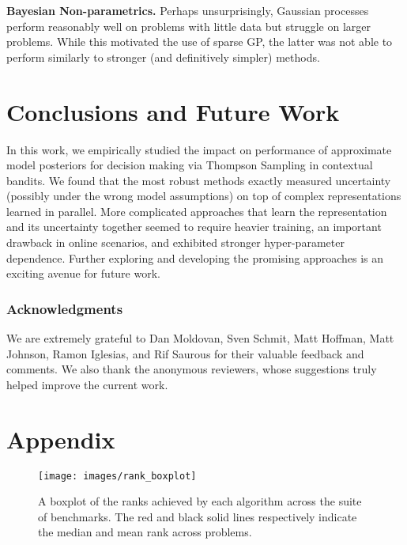 \documentclass{article} \usepackage{iclr2018_conference,times}
\begin{document}
\textbf{Bayesian Non-parametrics.} Perhaps unsurprisingly, Gaussian processes perform reasonably well on problems with little data but struggle on larger problems. While this motivated the use of sparse GP, the latter was not able to perform similarly to stronger (and definitively simpler) methods.
 \section{Conclusions and Future Work}\label{s:conclusions}

In this work, we empirically studied the impact on performance of approximate model posteriors for decision making via Thompson Sampling in contextual bandits.
We found that the most robust methods exactly measured uncertainty (possibly under the wrong model assumptions) on top of complex representations learned in parallel.
More complicated approaches that learn the representation and its uncertainty together seemed to require heavier training, an important drawback in online scenarios, and exhibited stronger hyper-parameter dependence.
Further exploring and developing the promising approaches is an exciting avenue for future work.
 



\newcommand*\rot{\rotatebox{90}}








\subsubsection*{Acknowledgments}
We are extremely grateful to Dan Moldovan, Sven Schmit, Matt Hoffman, Matt Johnson, Ramon Iglesias, and Rif Saurous for their valuable feedback and comments.
We also thank the anonymous reviewers, whose suggestions truly helped improve the current work.





\clearpage
\appendix
\section*{Appendix}

\begin{figure}[ht]
 \texttt{[image: images/rank\_boxplot]}
 \caption{A boxplot of the ranks achieved by each algorithm across the suite of benchmarks.  The red and black solid lines respectively indicate the median and mean rank across problems.}
 \label{fig:boxplot_results}
 \end{figure}
\end{document}
